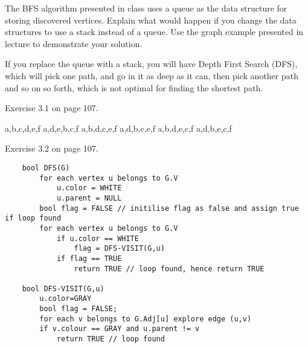 \documentclass[addpoints,11pt]{exam}
\begin{document}
\begin{questions}
\ifprintanswers
\newpage
\else
\bigskip
\fi


\question[5]
The BFS algorithm presented in class uses a queue as the data structure for storing discovered vertices.  Explain what would happen if you change the data structures to use a stack instead of a queue.  Use the graph example presented in lecture to demonstrate your solution.   

\begin{center}
	If you replace the queue with a stack, you will have Depth First Search (DFS), which will pick one path, and go in it as deep as it can, then pick another path and so on so forth, which is not optimal for finding the shortest path.
\end{center}
	
\ifprintanswers
\newpage
\else
\bigskip
\fi



\question[5] Exercise 3.1 on page 107.
\begin{center}
	a,b,c,d,e,f \newline
	a,d,e,b,c,f \newline
	a,b,d,c,e,f \newline
	a,d,b,c,e,f \newline
	a,b,d,e,c,f \newline
	a,d,b,e,c,f \newline
	
\end{center}

\ifprintanswers
\newpage
\else
\bigskip
\fi



\question[5] Exercise 3.2 on page 107.
\begin{lstlisting}
	bool DFS(G)
		for each vertex u belongs to G.V
			u.color = WHITE
			u.parent = NULL
		bool flag = FALSE // initilise flag as false and assign true if loop found
		for each vertex u belongs to G.V
			if u.color == WHITE
				flag = DFS-VISIT(G,u)
			if flag == TRUE
				return TRUE // loop found, hence return TRUE
	
	bool DFS-VISIT(G,u)
		u.color=GRAY
		bool flag = FALSE;
		for each v belongs to G.Adj[u] explore edge (u,v)
		if v.colour == GRAY and u.parent != v
			return TRUE // loop found
	

\end{lstlisting}
\end{questions}
\end{document}
